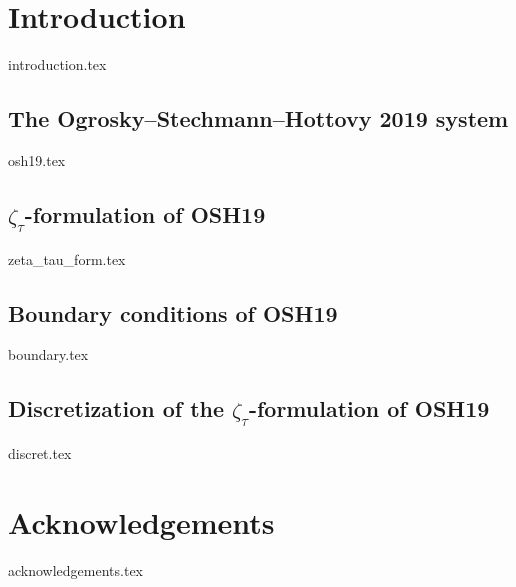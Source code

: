 \documentclass[letterpaper, 12pt]{article}
\begin{document}
\heading

\newpage

\tableofcontents

\newpage

\section{Introduction}
    {introduction.tex}
    
    \subsection{The Ogrosky--Stechmann--Hottovy 2019 system} \label{subsection:osh19}
    	{osh19.tex}
    	
    \subsection{$\zeta_{\tau}$-formulation of OSH19} \label{subsubsection:zeta_tau_form}
    		{zeta_tau_form.tex}

	\subsection{Boundary conditions of OSH19}
		{boundary.tex}

	\subsection{Discretization of the $\zeta_{\tau}$-formulation of OSH19} \label{subsection:discret}
    	{discret.tex}

  
   

	

\section*{Acknowledgements}
	{acknowledgements.tex}
    
\end{document}
